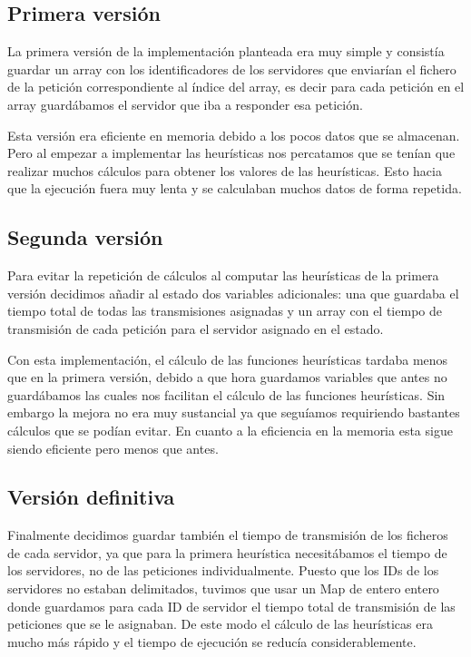 \subsection{Primera versión}

La primera versión de la implementación planteada era muy simple y consistía guardar un array con los identificadores
de los servidores que enviarían el fichero de la petición correspondiente al índice del array, es decir para cada
petición en el array guardábamos el servidor que iba a responder esa petición.

Esta versión era eficiente en memoria debido a los pocos datos que se almacenan. Pero al empezar a implementar las heurísticas
nos percatamos que se tenían que realizar muchos cálculos para obtener los valores de las heurísticas. Esto hacia que la
ejecución fuera muy lenta y se calculaban muchos datos de forma repetida.

\subsection{Segunda versión}
Para evitar la repetición de cálculos al computar las heurísticas de la primera versión decidimos añadir al estado
dos variables adicionales: una que guardaba el tiempo total de todas las transmisiones asignadas y un array con
el tiempo de transmisión de cada petición para el servidor asignado en el estado.

Con esta implementación, el cálculo de las funciones heurísticas tardaba menos que en la primera versión,
debido a que hora guardamos variables que antes no guardábamos las cuales nos facilitan el cálculo de las funciones heurísticas.
Sin embargo la mejora no era muy sustancial ya que seguíamos requiriendo bastantes cálculos que se podían evitar.
En cuanto a la eficiencia en la memoria esta sigue siendo eficiente pero menos que antes.

\subsection{Versión definitiva}

Finalmente decidimos guardar también el tiempo de transmisión de los ficheros de cada servidor, ya que para la primera
heurística necesitábamos el tiempo de los servidores, no de las peticiones individualmente.
Puesto que los IDs de los servidores no estaban delimitados, tuvimos que usar un Map de entero entero donde guardamos para cada ID de servidor
el tiempo total de transmisión de las peticiones que se le asignaban. De este modo el cálculo de las heurísticas era
mucho más rápido y el tiempo de ejecución se reducía considerablemente.

